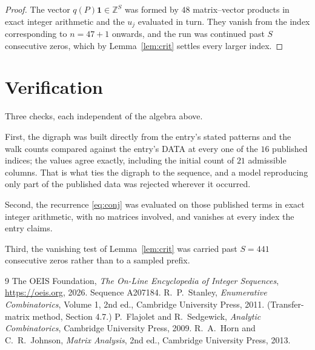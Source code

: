 \documentclass[11pt,a4paper]{article}
\theoremstyle{plain}
\theoremstyle{definition}
\begin{document}
\begin{proof}
The vector $q(P)\mathbf{1}\in\mathbb{Z}^{S}$ was formed by $48$ matrix--vector
products in exact integer arithmetic and the $u_j$ evaluated in turn. They vanish from the
index corresponding to $n=47+1$ onwards, and the run was continued past $S$ consecutive
zeros, which by Lemma~\ref{lem:crit} settles every larger index.
\end{proof}

\section{Verification}

Three checks, each independent of the algebra above.

First, the digraph was built directly from the entry's stated patterns and the walk counts
compared against the entry's DATA at every one of the $16$ published indices; the
values agree exactly, including the initial count of $21$ admissible columns. That is
what ties the digraph to the sequence, and a model reproducing only part of the published
data was rejected wherever it occurred.

Second, the recurrence \eqref{eq:conj} was evaluated on those published terms in exact
integer arithmetic, with no matrices involved, and vanishes at every index the entry claims.

Third, the vanishing test of Lemma~\ref{lem:crit} was carried past $S=441$ consecutive
zeros rather than to a sampled prefix.

\begin{thebibliography}{9}
 The OEIS Foundation, \emph{The On-Line Encyclopedia of Integer
Sequences}, \url{https://oeis.org}, 2026. Sequence A207184.
 R.~P.~Stanley, \emph{Enumerative Combinatorics}, Volume 1, 2nd ed.,
Cambridge University Press, 2011. (Transfer-matrix method, Section 4.7.)
 P.~Flajolet and R.~Sedgewick, \emph{Analytic Combinatorics}, Cambridge
University Press, 2009.
 R.~A.~Horn and C.~R.~Johnson, \emph{Matrix Analysis}, 2nd ed., Cambridge
University Press, 2013.
\end{thebibliography}
\end{document}
